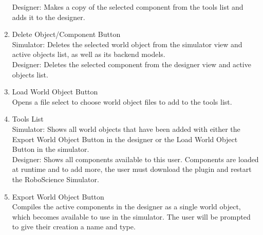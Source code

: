\begin{enumerate}
 	Designer: Makes a copy of the selected component from the tools list and adds it to the designer.\\
 	\item Delete Object/Component Button\\
 	Simulator: Deletes the selected world object from the simulator view and active objects list, as well as its backend models.\\
 	Designer: Deletes the selected component from the designer view and active objects list.\\
 	\item Load World Object Button\\
 	Opens a file select to choose world object files to add to the tools list.\\
 	\item Tools List\\
 	Simulator: Shows all world objects that have been added with either the Export World Object Button in the designer or the Load World Object Button in the simulator.\\
 	Designer: Shows all components available to this user. Components are loaded at runtime and to add more, the user must download the plugin and restart the RoboScience Simulator.\\
 	\item Export World Object Button\\
 	Compiles the active components in the designer as a single world object, which becomes available to use in the simulator. The user will be prompted to give their creation a name and type.\\ 	
 \end{enumerate}
 
